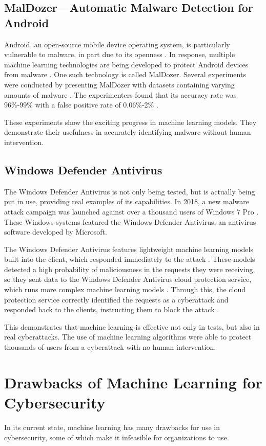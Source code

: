 \subsection{MalDozer---Automatic Malware Detection for Android}
Android, an open-source mobile device operating system, is particularly vulnerable to malware, in part due to its openness \cite{sustainablecities2021}.
In response, multiple machine learning technologies are being developed to protect Android devices from malware \cite{sustainablecities2021}.
One such technology is called MalDozer.
Several experiments were conducted by presenting MalDozer with datasets containing varying amounts of malware \cite{sustainablecities2021}.
The experimenters found that its accuracy rate was 96\%-99\% with a false positive rate of 0.06\%-2\% \cite{sustainablecities2021}.

These experiments show the exciting progress in machine learning models.
They demonstrate their usefulness in accurately identifying malware without human intervention.

\subsection{Windows Defender Antivirus}
The Windows Defender Antivirus is not only being tested, but is actually being put in use, providing real examples of its capabilities.
In 2018, a new malware attack campaign was launched against over a thousand users of Windows 7 Pro \cite{microsoft2018}.
These Windows systems featured the Windows Defender Antivirus, an antivirus software developed by Microsoft.

The Windows Defender Antivirus features lightweight machine learning models built into the client, which responded immediately to the attack \cite{microsoft2018}.
These models detected a high probability of maliciousness in the requests they were receiving, so they sent data to the Windows Defender Antivirus cloud protection service, which runs more complex machine learning models \cite{microsoft2018}.
Through this, the cloud protection service correctly identified the requests as a cyberattack and responded back to the clients, instructing them to block the attack \cite{microsoft2018}.

This demonstrates that machine learning is effective not only in tests, but also in real cyberattacks.
The use of machine learning algorithms were able to protect thousands of users from a cyberattack with no human intervention.

\section{Drawbacks of Machine Learning for Cybersecurity}
In its current state, machine learning has many drawbacks for use in cybersecurity, some of which make it infeasible for organizations to use.

